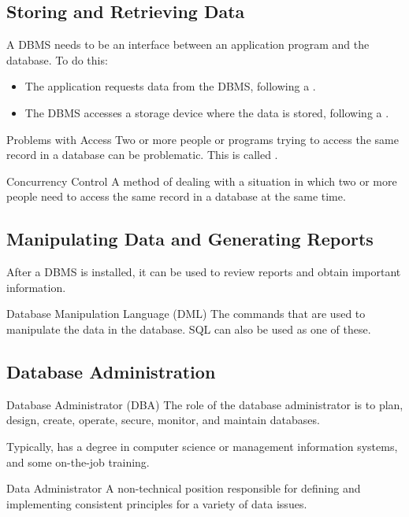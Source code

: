 \documentclass[\main/notes.tex]{subfiles}
\begin{document}
			\subsection{Storing and Retrieving Data}
				A DBMS needs to be an interface between an application program and the database. To do this:
				\begin{itemize}
					\item The application requests data from the DBMS, following a .
					\item The DBMS accesses a storage device where the data is stored, following a .
				\end{itemize}
				\begin{sidenote}{Problems with Access}
					Two or more people or programs trying to access the same record in a database can be problematic. This is called .
				\end{sidenote}
				\begin{definition}{Concurrency Control}
					A method of dealing with a situation in which two or more people need to access the same record in a database at the same time.
				\end{definition}
			\subsection{Manipulating Data and Generating Reports}
				After a DBMS is installed, it can be used to review reports and obtain important information.
				\begin{definition}{Database Manipulation Language (DML)}
					The commands that are used to manipulate the data in the database. SQL can also be used as one of these.
				\end{definition}
			\subsection{Database Administration}
				\begin{definition}{Database Administrator (DBA)}
					The role of the database administrator is to plan, design, create, operate, secure, monitor, and maintain databases.

					Typically, has a degree in computer science or management information systems, and some on-the-job training. 
				\end{definition}
				\begin{definition}{Data Administrator}
					A non-technical position responsible for defining and implementing consistent principles for a variety of data issues.
				\end{definition}
\end{document}
